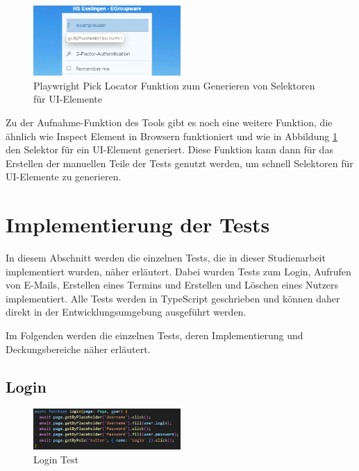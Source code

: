\begin{figure}[H]
    \centering
    \includegraphics[width=0.5\textwidth]{images/Playwright_PickLocator.png}
    \caption{Playwright Pick Locator Funktion zum Generieren von Selektoren für UI-Elemente}
    \label{fig:playwright-pick-locator}
\end{figure}

Zu der Aufnahme-Funktion des Tools gibt es noch eine weitere Funktion, die ähnlich wie Inspect Element in Browsern funktioniert und wie in Abbildung \ref{fig:playwright-pick-locator} den Selektor für ein UI-Element generiert.
Diese Funktion kann dann für das Erstellen der manuellen Teile der Tests genutzt werden, um schnell Selektoren für UI-Elemente zu generieren.



\section{Implementierung der Tests}

In diesem Abschnitt werden die einzelnen Tests, die in dieser Studienarbeit implementiert wurden, näher erläutert.
Dabei wurden Tests zum Login, Aufrufen von E-Mails, Erstellen eines Termins und Erstellen und Löschen eines Nutzers implementiert.
Alle Tests werden in TypeScript geschrieben und können daher direkt in der Entwicklungsumgebung ausgeführt werden.

Im Folgenden werden die einzelnen Tests, deren Implementierung und Deckungsbereiche näher erläutert.
\newpage
\subsection*{Login}

\begin{figure}[H]
    \centering
    \includegraphics[width=0.5\textwidth]{images/LoginTest.png}
    \caption{Login Test}
    \label{fig:login-test}
\end{figure}

